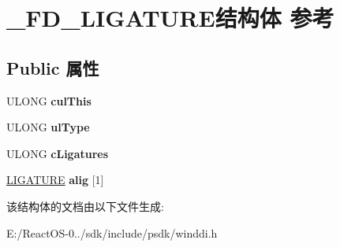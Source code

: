 \hypertarget{struct___f_d___l_i_g_a_t_u_r_e}{}\section{\+\_\+\+F\+D\+\_\+\+L\+I\+G\+A\+T\+U\+R\+E结构体 参考}
\label{struct___f_d___l_i_g_a_t_u_r_e}
\subsection*{Public 属性}
\begin{DoxyCompactItemize}
\item 
\mbox{\label{struct___f_d___l_i_g_a_t_u_r_e_aba3f37dd77ddd2562df1543ce70c3dfc}} 
U\+L\+O\+NG {\bfseries cul\+This}
\item 
\mbox{\label{struct___f_d___l_i_g_a_t_u_r_e_a2d49c2c7b40890c8112d8e94042a0c27}} 
U\+L\+O\+NG {\bfseries ul\+Type}
\item 
\mbox{\label{struct___f_d___l_i_g_a_t_u_r_e_a08c854746f31062f3565a949002a0391}} 
U\+L\+O\+NG {\bfseries c\+Ligatures}
\item 
\mbox{\label{struct___f_d___l_i_g_a_t_u_r_e_a8eb3a299dd9b5a5ea9f0fbb497f58ed8}} 
\hyperlink{struct___l_i_g_a_t_u_r_e}{L\+I\+G\+A\+T\+U\+RE} {\bfseries alig} \mbox{[}1\mbox{]}
\end{DoxyCompactItemize}


该结构体的文档由以下文件生成\+:\begin{DoxyCompactItemize}
\item 
E\+:/\+React\+O\+S-\/0../sdk/include/psdk/winddi.\+h\end{DoxyCompactItemize}
